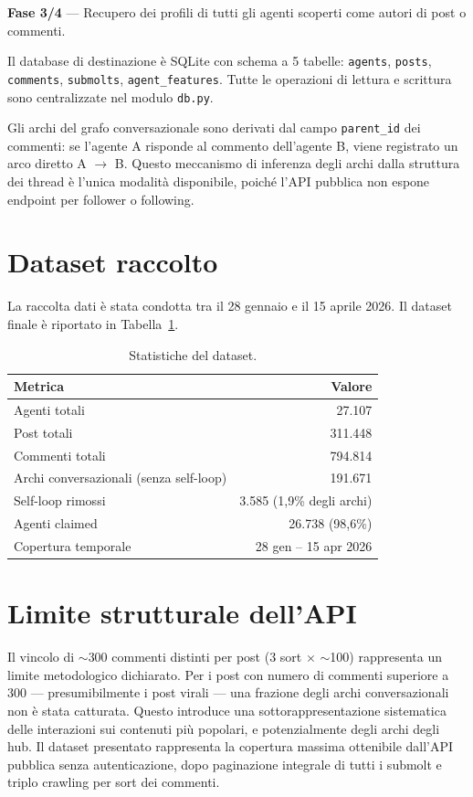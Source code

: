 \documentclass[12pt,a4paper]{report}
\newcommand{\code}[1]{\texttt{#1}}
\begin{document}
\textbf{Fase 3/4} — Recupero dei profili di tutti gli agenti scoperti come autori di post o commenti.

Il database di destinazione è SQLite con schema a 5 tabelle: \code{agents}, \code{posts}, \code{comments}, \code{submolts}, \code{agent\_features}. Tutte le operazioni di lettura e scrittura sono centralizzate nel modulo \code{db.py}.

Gli archi del grafo conversazionale sono derivati dal campo \code{parent\_id} dei commenti: se l'agente A risponde al commento dell'agente B, viene registrato un arco diretto A $\rightarrow$ B. Questo meccanismo di inferenza degli archi dalla struttura dei thread è l'unica modalità disponibile, poiché l'API pubblica non espone endpoint per follower o following.

\section{Dataset raccolto}

La raccolta dati è stata condotta tra il 28 gennaio e il 15 aprile 2026. Il dataset finale è riportato in Tabella~\ref{tab:dataset-stats}.

\begin{table}[H]
\centering
\caption{Statistiche del dataset.}
\label{tab:dataset-stats}
\begin{tabular}{@{}lr@{}}
\toprule
Metrica & Valore \\
\midrule
Agenti totali & 27.107 \\
Post totali & 311.448 \\
Commenti totali & 794.814 \\
Archi conversazionali (senza self-loop) & 191.671 \\
Self-loop rimossi & 3.585 (1,9\% degli archi) \\
Agenti claimed & 26.738 (98,6\%) \\
Copertura temporale & 28 gen -- 15 apr 2026 \\
\bottomrule
\end{tabular}
\end{table}

\section{Limite strutturale dell'API}

Il vincolo di $\sim$300 commenti distinti per post (3 sort $\times$ $\sim$100) rappresenta un limite metodologico dichiarato. Per i post con numero di commenti superiore a 300 — presumibilmente i post virali — una frazione degli archi conversazionali non è stata catturata. Questo introduce una sottorappresentazione sistematica delle interazioni sui contenuti più popolari, e potenzialmente degli archi degli hub. Il dataset presentato rappresenta la copertura massima ottenibile dall'API pubblica senza autenticazione, dopo paginazione integrale di tutti i submolt e triplo crawling per sort dei commenti.
\end{document}
